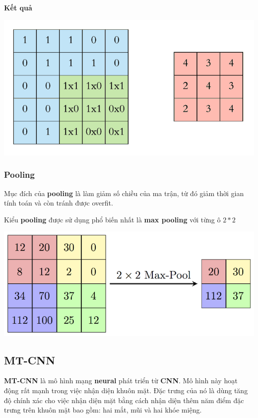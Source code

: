 \documentclass[12pt]{extreport}
\begin{document}
\bigskip

\textbf{Kết quả}
\begin{center}
\includegraphics[scale=0.6]{Image/Convolution_res}
\end{center}

\subsubsection{Pooling}
Mục đích của \textbf{pooling} là làm giảm số chiều của ma trận, từ đó giảm thời gian tính toán và còn tránh được overfit.

Kiểu \textbf{pooling} được sử dụng phổ biến nhất là \textbf{max pooling} với từng ô $2*2$

\begin{center}
\includegraphics[scale=2]{Image/MaxpoolSample2}
\end{center}


\subsection{MT-CNN}
\textbf{MT-CNN} là mô hình mạng \textbf{neural} phát triển từ \textbf{CNN}. Mô hình này hoạt động rất mạnh trong việc nhận diện khuôn mặt. Đặc trưng của nó là dùng tăng độ chính xác cho việc nhận diện mặt bằng cách nhận diện thêm năm điểm đặc trưng trên khuôn mặt bao gồm: hai mắt, mũi và hai khóe miệng.
\end{document}
